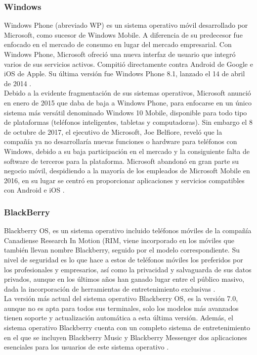 \subsubsection{Windows}

Windows Phone (abreviado WP) es un sistema operativo móvil desarrollado por Microsoft, como sucesor de Windows Mobile. A diferencia de su predecesor fue enfocado en el mercado de consumo en lugar del mercado empresarial. Con Windows Phone, Microsoft ofreció una nueva interfaz de usuario que integró varios de sus servicios activos. Compitió directamente contra Android de Google e iOS de Apple. Su última versión fue Windows Phone 8.1, lanzado el 14 de abril de 2014 \cite{MBWINP}. \\

Debido a la evidente fragmentación de sus sistemas operativos, Microsoft anunció en enero de 2015 que daba de baja a Windows Phone, para enfocarse en un único sistema más versátil denominado Windows 10 Mobile, disponible para todo tipo de plataformas (teléfonos inteligentes, tabletas y computadoras). Sin embargo el 8 de octubre de 2017, el ejecutivo de Microsoft, Joe Belfiore, reveló que la compañía ya no desarrollaría nuevas funciones o hardware para teléfonos con Windows, debido a su baja participación en el mercado y la consiguiente falta de software de terceros para la plataforma. Microsoft abandonó en gran parte su negocio móvil, despidiendo a la mayoría de los empleados de Microsoft Mobile en 2016, en su lugar se centró en proporcionar aplicaciones y servicios compatibles con Android e iOS \cite{MBWIN10}. \\

\subsubsection{BlackBerry}

Blackberry OS, es un sistema operativo incluido teléfonos móviles de la compañía Canadiense Research In Motion (RIM, viene incorporado en los móviles que también llevan nombre Blackberry, seguido por el modelo correspondiente. Su nivel de seguridad es lo que hace a estos de teléfonos móviles los preferidos por los profesionales y empresarios, así como la privacidad y salvaguarda de sus datos privados, aunque en los últimos años han ganado lugar entre el público masivo, dada la incorporación de herramientas de entretenimiento exclusivas \cite{MBBLACK}. \\

La versión más actual del sistema operativo Blackberry OS, es la versión 7.0, aunque no es apta para todos sus terminales, solo los modelos más avanzados tienen soporte y actualización automática a esta última versión. Además, el sistema operativo Blackberry cuenta con un completo sistema de entretenimiento en el que se incluyen Blackberry Music y Blackberry Messenger dos aplicaciones esenciales para los usuarios de este sistema operativo \cite{MBBLACK}.\\


